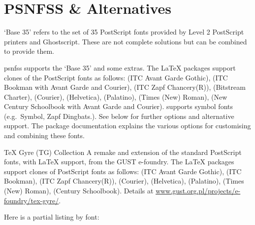 \documentclass[a4paper,welsh,british,twocolumn]{article}
\begin{document}
\section{PSNFSS \& Alternatives}\label{sec:ps35}
‘Base 35’ refers to the set of 35 PostScript fonts provided by Level 2 PostScript printers and Ghostscript.
These are not complete solutions but can be combined to provide them.
\begin{fontopts}
  \item[psnfss] supports the ‘Base 35’ and some extras.
  The \LaTeX{} packages support clones of the PostScript fonts as follows:  (ITC Avant Garde Gothic),  (ITC Bookman with Avant Garde and Courier),  (ITC Zapf Chancery(R)),  (Bitstream Charter),  (Courier),  (Helvetica),  (Palatino),  (Times (New) Roman),  (New Century Schoolbook with Avant Garde and Courier).
   supports symbol fonts (e.g.~Symbol, Zapf Dingbats.).
  See below for further options and alternative support.
  The package documentation explains the various options for customising and combining these fonts.
  \item[TeX Gyre (TG) Collection] A remake and extension of the standard PostScript fonts, with \LaTeX{} support, from the GUST e-foundry.
  The \LaTeX{} packages support clones of PostScript fonts as follows:  (ITC Avant Garde Gothic),  (ITC Bookman),  (ITC Zapf Chancery(R)),  (Courier),  (Helvetica),  (Palatino),  (Times (New) Roman),  (Century Schoolbook).
  Details at \url{www.gust.org.pl/projects/e-foundry/tex-gyre/}.
\end{fontopts}
Here is a partial listing by font:
\end{document}
